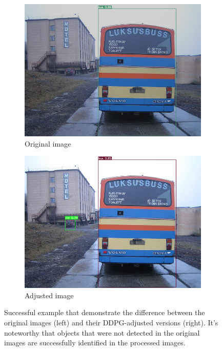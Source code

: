 \documentclass{PHlab-thesis}
\begin{document}
\begin{figure}[H]
    \begin{subfigure}{0.45\textwidth}
        \centering
        \includegraphics[width=\textwidth]{images/instances/original_image_3.png}
        \caption{Original image}
    \end{subfigure}
    \quad
    \begin{subfigure}{0.45\textwidth}
        \centering
        \includegraphics[width=\textwidth]{images/instances/adjusted_image_3.png}
        \caption{Adjusted image}
    \end{subfigure}
    \caption[Successful example with DDPG adjustments]{Successful example that demonstrate the difference between the original images (left) and their DDPG-adjusted versions (right). It's noteworthy that objects that were not detected in the original images are successfully identified in the processed images.}
\end{figure}
\end{document}
